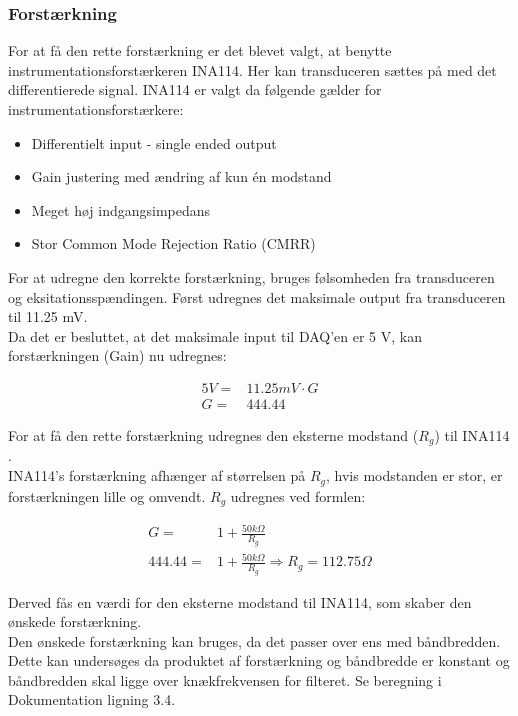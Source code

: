 \subsubsection{Forstærkning}
For at få den rette forstærkning er det blevet valgt, at benytte instrumentationsforstærkeren INA114. Her kan transduceren sættes på med det differentierede signal. INA114 er valgt da følgende gælder\cite{Instrumentation} for instrumentationsforstærkere: 
\begin{itemize}
	\item Differentielt input - single ended output 
	\item Gain justering med ændring af kun én modstand 
	\item Meget høj indgangsimpedans 
	\item Stor Common Mode Rejection Ratio (CMRR)
\end{itemize}
For at udregne den korrekte forstærkning, bruges følsomheden fra transduceren og eksitationsspændingen.
Først udregnes det maksimale output fra transduceren til 11.25 mV.\\ 
Da det er besluttet, at det maksimale input til DAQ'en \cite{DSB} er 5 V, kan forstærkningen (Gain) nu udregnes:
\begin{ceqn}
\begin{equation}
\begin{split}
5V=& 11.25mV \cdot G \\
G =& 444.44
\end{split}
\end{equation}
\end{ceqn}
For at få den rette forstærkning udregnes den eksterne modstand ($ R_g $) til INA114 \cite{INA}.\\ 
INA114's forstærkning afhænger af størrelsen på $ R_g $, hvis modstanden er stor, er forstærkningen lille og omvendt.  $ R_g $ udregnes ved formlen: 
\begin{ceqn}
\begin{equation}
\begin{split}
G=&1+\frac{50k\Omega}{R_g}\\
444.44=& 1+\frac{50k\Omega}{R_g} \Rightarrow R_g= 112.75 \Omega
\end{split}
\end{equation}
\end{ceqn}
Derved fås en værdi for den eksterne modstand til INA114, som skaber den ønskede forstærkning.\\
\newline
Den ønskede forstærkning kan bruges, da det passer over ens med båndbredden. Dette kan undersøges da produktet af forstærkning og båndbredde er konstant og båndbredden skal ligge over knækfrekvensen for filteret. Se beregning i Dokumentation ligning 3.4.\\
